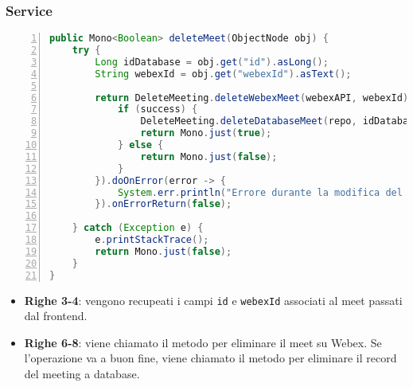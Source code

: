 \subsubsection{Service}
\begin{lstlisting}[language=java, frame=lines, basicstyle=\ttfamily\scriptsize, numbers=left]
public Mono<Boolean> deleteMeet(ObjectNode obj) {
    try {
        Long idDatabase = obj.get("id").asLong();
        String webexId = obj.get("webexId").asText();

        return DeleteMeeting.deleteWebexMeet(webexAPI, webexId).flatMap(success -> {
            if (success) {
                DeleteMeeting.deleteDatabaseMeet(repo, idDatabase);
                return Mono.just(true);
            } else {
                return Mono.just(false);
            }
        }).doOnError(error -> {
            System.err.println("Errore durante la modifica del meeting su Webex: " + error.getMessage());
        }).onErrorReturn(false);

    } catch (Exception e) {
        e.printStackTrace();
        return Mono.just(false);
    }
}
\end{lstlisting}
\begin{itemize}
    \item \textbf{Righe 3-4}: vengono recupeati i campi \texttt{id} e \texttt{webexId} associati al meet passati dal frontend. 
    \item \textbf{Righe 6-8}: viene chiamato il metodo per eliminare il meet su Webex. Se l'operazione va a buon fine, 
    viene chiamato il metodo per eliminare il record del meeting a database. 
\end{itemize}
